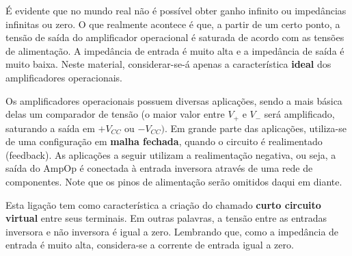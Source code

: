 \documentclass{article}
\numberwithin{equation}{section}
\begin{document}
\begin{center}
\end{center}

É evidente que no mundo real não é possível obter ganho infinito ou impedâncias infinitas ou zero. O que realmente acontece é que, a partir de um certo ponto, a tensão de saída do amplificador operacional é saturada de acordo com as tensões de alimentação. A impedância de entrada é muito alta e a impedância de saída é muito baixa. Neste material, considerar-se-á apenas a característica \textbf{ideal} dos amplificadores operacionais.

Os amplificadores operacionais possuem diversas aplicações, sendo a mais básica delas um comparador de tensão (o maior valor entre $V_{+}$ e $V_{-}$ será amplificado, saturando a saída em $+V_{CC}$ ou $-V_{CC})$. Em grande parte das aplicações, utiliza-se de uma configuração em \textbf{malha fechada}, quando o circuito é realimentado (feedback). As aplicações a seguir utilizam a realimentação negativa, ou seja, a saída do AmpOp é conectada à entrada inversora através de uma rede de componentes. Note que os pinos de alimentação serão omitidos daqui em diante.

\begin{center}
\end{center}

Esta ligação tem como característica a criação do chamado \textbf{curto circuito virtual} entre seus terminais. Em outras palavras, a tensão entre as entradas inversora e não inversora é igual a zero. Lembrando que, como a impedância de entrada é muito alta, considera-se a corrente de entrada igual a zero.
\end{document}
